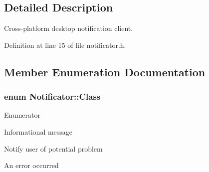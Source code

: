 \subsection{Detailed Description}
Cross-\/platform desktop notification client. 

Definition at line 15 of file notificator.\+h.



\subsection{Member Enumeration Documentation}
\hypertarget{class_notificator_aa2ff8a05d471e32e77584a2b8dd182ab}{}
\subsubsection[{Class}]{\setlength{\rightskip}{0pt plus 5cm}enum {\bf Notificator\+::\+Class}}\label{class_notificator_aa2ff8a05d471e32e77584a2b8dd182ab}
\begin{Desc}
\item[Enumerator]\par
\begin{description}
\item[{\em 
\hypertarget{class_notificator_aa2ff8a05d471e32e77584a2b8dd182aba195b01e918cc724c6ad65f5037e85f83}{}Information\label{class_notificator_aa2ff8a05d471e32e77584a2b8dd182aba195b01e918cc724c6ad65f5037e85f83}
}]Informational message \item[{\em 
\hypertarget{class_notificator_aa2ff8a05d471e32e77584a2b8dd182abac33ad19811d3b1d6b57305dd75d63a5e}{}Warning\label{class_notificator_aa2ff8a05d471e32e77584a2b8dd182abac33ad19811d3b1d6b57305dd75d63a5e}
}]Notify user of potential problem \item[{\em 
\hypertarget{class_notificator_aa2ff8a05d471e32e77584a2b8dd182aba596518f9cfdbd57b0fdc68fc95c69ecd}{}Critical\label{class_notificator_aa2ff8a05d471e32e77584a2b8dd182aba596518f9cfdbd57b0fdc68fc95c69ecd}
}]An error occurred \end{description}
\end{Desc}


